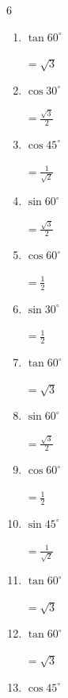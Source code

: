 \begin{multicols}{6}
\begin{enumerate}
        $\displaystyle =\frac{1}{\sqrt{2}}$

  \item $\displaystyle \tan{60^\circ}$

        $\displaystyle =\sqrt{3}$

  \item $\displaystyle \cos{30^\circ}$

        $\displaystyle =\frac{\sqrt{3}}{2}$

  \item $\displaystyle \cos{45^\circ}$

        $\displaystyle =\frac{1}{\sqrt{2}}$

  \item $\displaystyle \sin{60^\circ}$

        $\displaystyle =\frac{\sqrt{3}}{2}$

  \item $\displaystyle \cos{60^\circ}$

        $\displaystyle =\frac{1}{2}$

  \item $\displaystyle \sin{30^\circ}$

        $\displaystyle =\frac{1}{2}$

  \item $\displaystyle \tan{60^\circ}$

        $\displaystyle =\sqrt{3}$

  \item $\displaystyle \sin{60^\circ}$

        $\displaystyle =\frac{\sqrt{3}}{2}$

  \item $\displaystyle \cos{60^\circ}$

        $\displaystyle =\frac{1}{2}$

  \item $\displaystyle \sin{45^\circ}$

        $\displaystyle =\frac{1}{\sqrt{2}}$

  \item $\displaystyle \tan{60^\circ}$

        $\displaystyle =\sqrt{3}$

\columnbreak %

  \item $\displaystyle \tan{60^\circ}$

        $\displaystyle =\sqrt{3}$

  \item $\displaystyle \cos{45^\circ}$


\end{enumerate}
\end{multicols}
